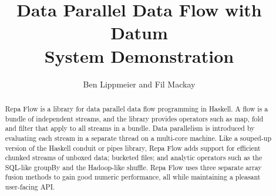 \documentclass{llncs}
\begin{document}
\title          {Data Parallel Data Flow with Datum \\
                        System Demonstration }
\author         {Ben Lippmeier and Fil Mackay}
\maketitle


\begin{abstract}
Repa Flow is a library for data parallel data flow programming in Haskell. A flow is a bundle of independent streams, and the library provides operators such as map, fold and filter that apply to all streams in a bundle. Data parallelism is introduced by evaluating each stream in a separate thread on a multi-core machine. Like a souped-up version of the Haskell conduit or pipes library, Repa Flow adds support for efficient chunked streams of unboxed data; bucketed files; and analytic operators such as the SQL-like groupBy and the Hadoop-like shuffle. Repa Flow uses three separate array fusion methods to gain good numeric performance, all while maintaining a pleasant user-facing API.
\end{abstract}



\end{document}
